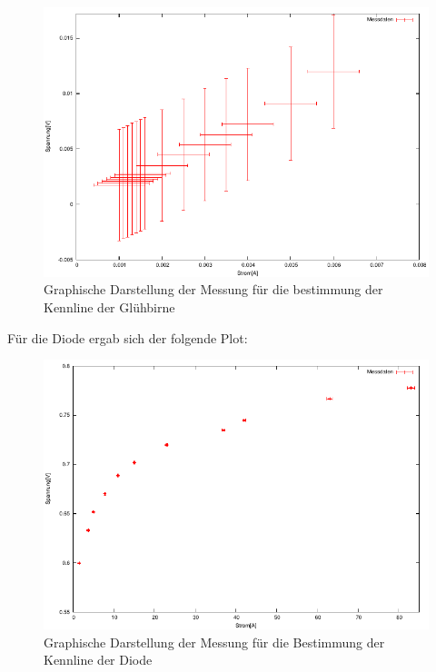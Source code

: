 \documentclass[12pt]{scrartcl}
\begin{document}
\begin{figure}[htbp] 
	 \centering
	   \includegraphics[scale = 1]{Gluebirne.pdf}
	 	\caption[Graphische Darstellung der Messung für die bestimmung der Kennline der Glühbirne]{Graphische Darstellung der Messung für die bestimmung der Kennline der Glühbirne}
	 \label{fig:aufgabe_6_a_plot}
\end{figure}

Für die Diode ergab sich der folgende Plot:

\begin{figure}[htbp] 
	 \centering
	   \includegraphics[scale = 1]{Diode.pdf}
	 	\caption[Graphische Darstellung der Messung für die Bestimmung der Kennline der Diode]{Graphische Darstellung der Messung für die Bestimmung der Kennline der Diode}
	 \label{fig:aufgabe_6_a_plot}
\end{figure}
\end{document}
